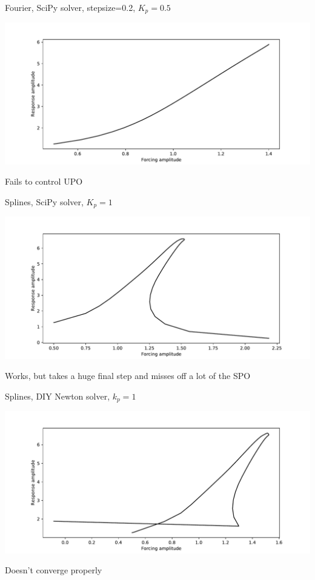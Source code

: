 \documentclass[presentation]{beamer}
\begin{document}
\begin{frame}[label={sec:org8b1e53a}]{Fourier, SciPy solver, stepsize=0.2, \(K_p=0.5\)}
\begin{center}
\includegraphics[width=.9\linewidth]{./kp0d5_transtime100_scipy_fourier_ss0d2.pdf}
\end{center}

Fails to control UPO
\end{frame}

\begin{frame}[label={sec:org6ddf300}]{Splines, SciPy solver, \(K_p=1\)}
\begin{center}
\includegraphics[width=.9\linewidth]{./kp1_transtime100_scipy.pdf}
\end{center}

Works, but takes a huge final step and misses off a lot of the SPO
\end{frame}

\begin{frame}[label={sec:org044a6c7}]{Splines, DIY Newton solver, \(k_p=1\)}
\begin{center}
\includegraphics[width=.9\linewidth]{./kp1_transtime100_newton.pdf}
\end{center}

Doesn't converge properly
\end{frame}
\end{document}

